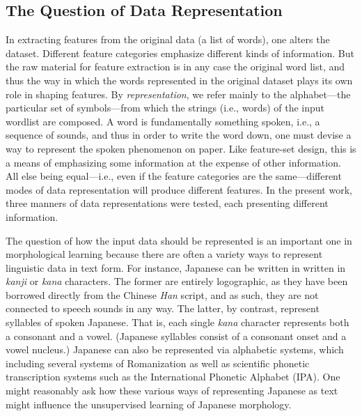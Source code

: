 \subsection{The Question of Data Representation} 
In extracting features from the original data (a list of words), one alters the dataset. Different feature categories emphasize different kinds of information. But the raw material for feature extraction is in any case the original word list, and thus the way in which the words represented in the original dataset plays its own role in shaping features. 
By \emph{representation}, we refer mainly to the alphabet---the
particular set of symbols---from which the strings (i.e., words) of the input wordlist 
are composed.  A word is fundamentally something spoken, i.e., a sequence of sounds, and thus in order to write the word down, one must devise a way to represent the spoken phenomenon on paper. Like feature-set design, this is a means of emphasizing some information at the expense of other information. All else being equal---i.e., even if the feature categories are the same---different modes of data representation will produce different features.  
In the present work, three manners of data representations were tested, each presenting 
different information. 

The question of how the input data should be represented is an important one in morphological learning because there are often 
a variety ways to represent linguistic data in text form. 
For instance, Japanese can be written in written in \textit{kanji} or 
\textit{kana} characters. The former are entirely logographic, as they 
have been borrowed directly from the Chinese \textit{Han} script, 
and as such, they are not connected to speech sounds in any way. The latter, by contrast,
represent syllables of spoken Japanese. That is, each single \textit{kana} 
character represents both a consonant and a vowel.  (Japanese syllables consist of a consonant onset and a vowel nucleus.)  Japanese can also be represented via alphabetic systems, which including several systems of Romanization as well as scientific phonetic transcription systems such as the International Phonetic Alphabet (IPA).  One might reasonably ask how these various ways of representing Japanese as text might influence the unsupervised learning of Japanese morphology.

